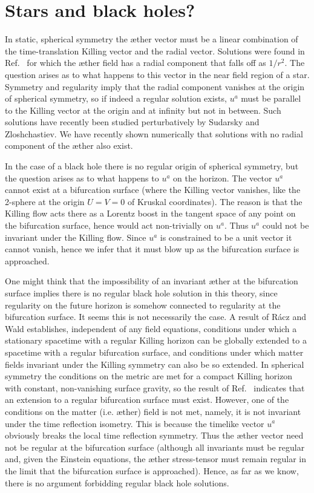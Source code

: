 \documentclass[aps]{ws-procs9x6}
\begin{document}
\section{Stars and black holes?}

In static, spherical symmetry the {\ae}ther vector must be a
linear combination of the time-translation Killing vector and the
radial vector. Solutions were found in Ref.~ for
which the {\ae}ther field has a radial component that falls off as
$1/r^2$. The question arises as to what happens to this vector in
the near field region of a star. Symmetry and regularity imply
that the radial component vanishes at the origin of spherical
symmetry, so if indeed a regular solution exists, $u^a$ must be
parallel to the Killing vector at the origin and at infinity but
not in between. Such solutions have recently been studied
perturbatively by Sudarsky and Zloshchastiev\cite{SZ}. We have
recently shown numerically that solutions with no radial component
of the {\ae}ther also exist\cite{ElingJ3}.

In the case of a black hole there is no regular origin
of spherical symmetry, but the question arises as to what
happens to $u^a$ on the horizon. The vector $u^a$ cannot
exist at a bifurcation surface (where the Killing vector
vanishes, like the 2-sphere at the origin $U=V=0$
of Kruskal coordinates).
The reason is that the Killing flow acts there as a Lorentz
boost in the tangent space of any point on the bifurcation
surface, hence would act non-trivially on $u^a$. Thus
$u^a$ could not be invariant under the Killing
flow. Since $u^a$ is constrained to be a unit vector
it cannot vanish, hence we infer that it must blow up as the
bifurcation surface is approached.

One might think that the impossibility of an invariant {\ae}ther
at the bifurcation surface implies there is no regular black hole
solution in this theory, since regularity on the future horizon
is somehow connected to regularity at the bifurcation surface. It
seems this is not necessarily the case. A result of R\'{a}cz and
Wald\cite{RaczWald} establishes, independent of any field
equations, conditions under which a stationary spacetime with a
regular Killing horizon can be globally extended to a spacetime
with a regular bifurcation surface, and conditions under which
matter fields invariant under the Killing symmetry can also be so
extended. In spherical symmetry the conditions on the metric are
met for a compact Killing horizon with constant, non-vanishing
surface gravity, so the result of Ref.~
indicates that an extension to a regular bifurcation surface must
exist. However, one of the conditions on the matter (i.e.
{\ae}ther) field is not met, namely, it is not invariant under
the time reflection isometry. This is because the timelike vector
$u^a$ obviously breaks the local time reflection symmetry. Thus
the {\ae}ther vector need not be regular at the bifurcation
surface (although all invariants must be regular and, given the
Einstein equations, the {\ae}ther stress-tensor must remain
regular in the limit that the bifurcation surface is approached).
Hence, as far as we know, there is no argument forbidding regular
black hole solutions.
\end{document}
